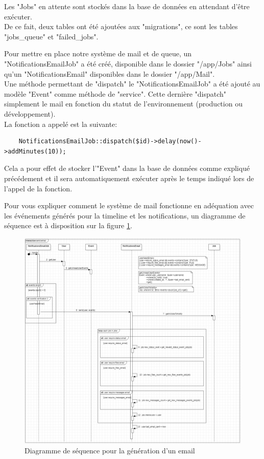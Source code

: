 \documentclass[
    iai, %
    il, %
]{heig-tb}
\begin{document}
Les "Jobs" en attente sont stockés dans la base de données en attendant d'être exécuter. \\
De ce fait, deux tables ont été ajoutées aux "migrations", ce sont les tables "jobs_queue" et "failed_jobs".

Pour mettre en place notre système de mail et de queue, un "NotificationsEmailJob" a été créé, disponible dans le dossier "/app/Jobs" ainsi qu'un "NotificationsEmail" disponibles dans le dossier "/app/Mail". \\
Une méthode permettant de "dispatch" le "NotificationsEmailJob" a été ajouté au modèle "Event" comme méthode de "service". Cette dernière "dispatch" simplement le mail en fonction du statut de l'environnement (production ou développement). \\
La fonction a appelé est la suivante:
\begin{verbatim}
    NotificationsEmailJob::dispatch($id)->delay(now()->addMinutes(10));
\end{verbatim}

Cela a pour effet de stocker l'"Event" dans la base de données comme expliqué précédement et il sera automatiquement exécuter après le temps indiqué lors de l'appel de la fonction.

Pour vous expliquer comment le système de mail fonctionne en adéquation avec les événements générés pour la timeline et les notifications, un diagramme de séquence est à disposition sur la figure \ref{events-email-sequence}.

\begin{center}
    \begin{figure}
        \includegraphics[width=\textwidth]{./assets/figures/emails-events-sequence.png}
        \caption{Diagramme de séquence pour la génération d'un email \label{events-email-sequence}}
    \end{figure}
\end{center}
\end{document}
